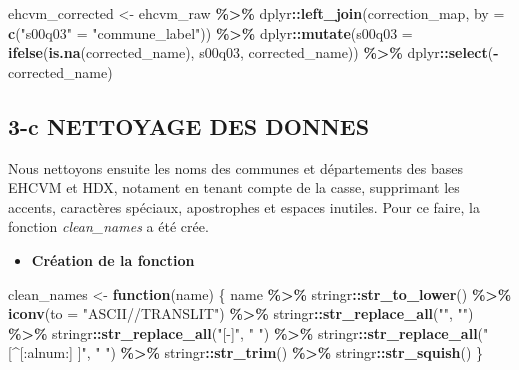 \documentclass[
]{article}
\newenvironment{Shaded}{\begin{snugshade}}{\end{snugshade}}
\newcommand{\AttributeTok}[1]{\textcolor[rgb]{0.13,0.29,0.53}{#1}}
\newcommand{\ControlFlowTok}[1]{\textcolor[rgb]{0.13,0.29,0.53}{\textbf{#1}}}
\newcommand{\FunctionTok}[1]{\textcolor[rgb]{0.13,0.29,0.53}{\textbf{#1}}}
\newcommand{\NormalTok}[1]{#1}
\newcommand{\OtherTok}[1]{\textcolor[rgb]{0.56,0.35,0.01}{#1}}
\newcommand{\SpecialCharTok}[1]{\textcolor[rgb]{0.81,0.36,0.00}{\textbf{#1}}}
\newcommand{\StringTok}[1]{\textcolor[rgb]{0.31,0.60,0.02}{#1}}
\providecommand{\tightlist}{%
  \setlength{\itemsep}{0pt}\setlength{\parskip}{0pt}}
\begin{document}
\begin{Shaded}
\begin{Highlighting}[]
\NormalTok{ehcvm\_corrected }\OtherTok{\textless{}{-}}\NormalTok{ ehcvm\_raw }\SpecialCharTok{\%\textgreater{}\%}
\NormalTok{  dplyr}\SpecialCharTok{::}\FunctionTok{left\_join}\NormalTok{(correction\_map, }
                   \AttributeTok{by =} \FunctionTok{c}\NormalTok{(}\StringTok{"s00q03"} \OtherTok{=} \StringTok{"commune\_label"}\NormalTok{)) }\SpecialCharTok{\%\textgreater{}\%}
\NormalTok{  dplyr}\SpecialCharTok{::}\FunctionTok{mutate}\NormalTok{(}\AttributeTok{s00q03 =} \FunctionTok{ifelse}\NormalTok{(}\FunctionTok{is.na}\NormalTok{(corrected\_name),}
\NormalTok{                                s00q03, corrected\_name)) }\SpecialCharTok{\%\textgreater{}\%}
\NormalTok{  dplyr}\SpecialCharTok{::}\FunctionTok{select}\NormalTok{(}\SpecialCharTok{{-}}\NormalTok{corrected\_name)}
\end{Highlighting}
\end{Shaded}

\subsection{3-c NETTOYAGE DES DONNES}\label{c-nettoyage-des-donnes}

Nous nettoyons ensuite les noms des communes et départements des bases
EHCVM et HDX, notament en tenant compte de la casse, supprimant les
accents, caractères spéciaux, apostrophes et espaces inutiles. Pour ce
faire, la fonction \emph{clean\_names} a été crée.

\begin{itemize}
\tightlist
\item
  \textbf{Création de la fonction}
\end{itemize}

\begin{Shaded}
\begin{Highlighting}[]
\NormalTok{clean\_names }\OtherTok{\textless{}{-}} \ControlFlowTok{function}\NormalTok{(name) \{}
\NormalTok{  name }\SpecialCharTok{\%\textgreater{}\%}
\NormalTok{    stringr}\SpecialCharTok{::}\FunctionTok{str\_to\_lower}\NormalTok{() }\SpecialCharTok{\%\textgreater{}\%}
    \FunctionTok{iconv}\NormalTok{(}\AttributeTok{to =} \StringTok{"ASCII//TRANSLIT"}\NormalTok{) }\SpecialCharTok{\%\textgreater{}\%} 
\NormalTok{    stringr}\SpecialCharTok{::}\FunctionTok{str\_replace\_all}\NormalTok{(}\StringTok{"\textquotesingle{}"}\NormalTok{, }\StringTok{""}\NormalTok{) }\SpecialCharTok{\%\textgreater{}\%}
\NormalTok{    stringr}\SpecialCharTok{::}\FunctionTok{str\_replace\_all}\NormalTok{(}\StringTok{"[{-}]"}\NormalTok{, }\StringTok{" "}\NormalTok{) }\SpecialCharTok{\%\textgreater{}\%}
\NormalTok{    stringr}\SpecialCharTok{::}\FunctionTok{str\_replace\_all}\NormalTok{(}\StringTok{"[\^{}[:alnum:] ]"}\NormalTok{, }\StringTok{" "}\NormalTok{) }\SpecialCharTok{\%\textgreater{}\%}
\NormalTok{    stringr}\SpecialCharTok{::}\FunctionTok{str\_trim}\NormalTok{() }\SpecialCharTok{\%\textgreater{}\%}
\NormalTok{    stringr}\SpecialCharTok{::}\FunctionTok{str\_squish}\NormalTok{()}
\NormalTok{\}}
\end{Highlighting}
\end{Shaded}
\end{document}
